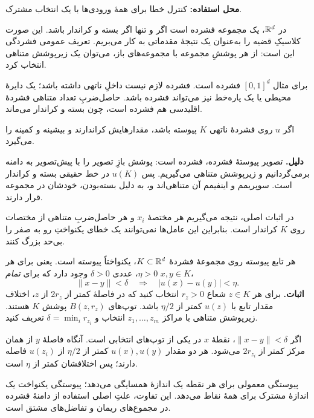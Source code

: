 \textbf{محل استفاده:} کنترل خطا برای همهٔ ورودی‌ها با یک انتخاب مشترک.

در $\mathbb R^d$، یک مجموعه فشرده است اگر و تنها اگر بسته و کراندار باشد. این صورت کلاسیکِ قضیه را به‌عنوان یک نتیجهٔ مقدماتی به کار می‌بریم. تعریف عمومی فشردگی این است: از هر پوششِ مجموعه با مجموعه‌های باز، می‌توان یک زیرپوشش متناهی انتخاب کرد.

برای مثال $[0,1]^d$ فشرده است. فشرده لازم نیست داخلِ ناتهی داشته باشد؛ یک دایرهٔ محیطی یا یک پاره‌خط نیز می‌تواند فشرده باشد. حاصل‌ضربِ تعداد متناهی فشردهٔ اقلیدسی هم فشرده است، چون بسته و کراندار می‌ماند.

اگر $u$ روی فشردهٔ ناتهی $K$ پیوسته باشد، مقدارهایش کراندارند و بیشینه و کمینه را می‌گیرد.

\textbf{دلیل.} تصویر پیوستهٔ فشرده، فشرده است: پوشش بازِ تصویر را با پیش‌تصویر به دامنه برمی‌گردانیم و زیرپوشش متناهی می‌گیریم. پس $u(K)$ در خط حقیقی بسته و کراندار است. سوپریمم و اینفیمم آن متناهی‌اند و، به دلیل بسته‌بودن، خودشان در مجموعه قرار دارند.

در اثبات اصلی، نتیجه می‌گیریم هر مختصهٔ $x_i$ و هر حاصل‌ضربِ متناهی از مختصات روی $K$ کراندار است. بنابراین این عامل‌ها نمی‌توانند یک خطای یکنواختِ رو به صفر را بی‌حد بزرگ کنند.

هر تابع پیوسته روی مجموعهٔ فشردهٔ $K\subset\mathbb R^d$، یکنواختاً پیوسته است. یعنی برای هر $\eta>0$، عددی $\delta>0$ وجود دارد که برای \emph{تمام} $x,y\in K$،
\[
\|x-y\|<\delta\quad\Longrightarrow\quad |u(x)-u(y)|<\eta.
\]
\textbf{اثبات.} برای هر $z\in K$ شعاع $r_z>0$ انتخاب کنید که در فاصلهٔ کمتر از $2r_z$ از $z$، اختلاف مقدار تابع با $u(z)$ کمتر از $\eta/2$ باشد. توپ‌های $B(z,r_z)$ پوشش $K$ هستند. زیرپوشش متناهی با مراکز $z_1,\ldots,z_m$ انتخاب و $\delta=\min_i r_{z_i}$ تعریف کنید.

اگر $\|x-y\|<\delta$، نقطهٔ $x$ در یکی از توپ‌های انتخابی است. آنگاه فاصلهٔ $y$ از همان مرکز کمتر از $2r_{z_i}$ می‌شود. هر دو مقدار $u(x),u(y)$ کمتر از $\eta/2$ از $u(z_i)$ فاصله دارند؛ پس اختلافشان کمتر از $\eta$ است.

\begin{intuition}
پیوستگی معمولی برای هر نقطه یک اندازهٔ همسایگی می‌دهد؛ پیوستگی یکنواخت یک اندازهٔ مشترک برای همهٔ نقاط می‌دهد. این تفاوت، علتِ اصلی استفاده از دامنهٔ فشرده در مجموع‌های ریمان و تفاضل‌های مشتق است.
\end{intuition}


